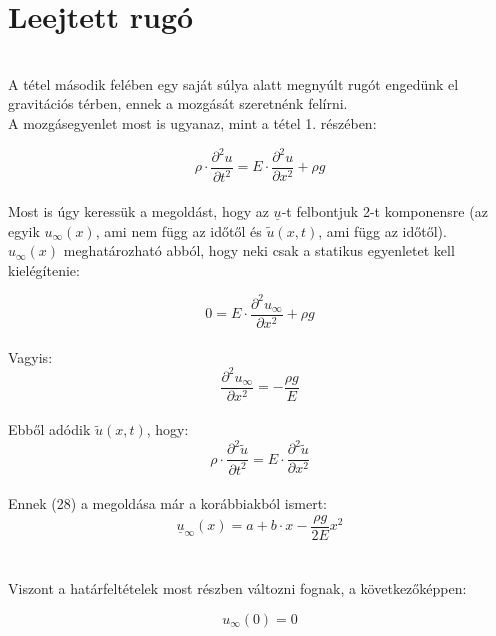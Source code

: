 \documentclass[a4paper]{article}
\begin{document}
\section*{Leejtett rugó}
\\
A tétel második felében egy saját súlya alatt megnyúlt rugót engedünk el gravitációs térben, ennek a mozgását szeretnénk felírni.
\\
A mozgásegyenlet most is ugyanaz, mint a tétel 1. részében:

\begin{equation}
\label{}
\rho \cdot\frac{\partial^{2} u}{\partial t^{2}}=E \cdot \frac{\partial^{2} u}{\partial x^{2}}+\rho g
\end{equation}
\\
Most is úgy keressük a megoldást, hogy az  $\underline{u}$-t felbontjuk 2-t komponensre (az egyik $u_{\infty}(x)$, ami nem függ az időtől és  $\tilde{u}(x,t)$, ami függ az időtől).
\\ 
$u_{\infty}(x)$ meghatározható abból, hogy neki csak a statikus egyenletet kell kielégítenie:

\begin{equation}
\label{}
0=E \cdot \frac{\partial^{2} u_{\infty}}{\partial x^{2}}+\rho g
\end{equation}
\\
Vagyis:
\begin{equation}
\label{}
\frac{\partial^{2} u_{\infty}}{\partial x^{2}}=- \frac{\rho g}{E}
\end{equation}
\\
Ebből adódik $\tilde{u}(x,t)$, hogy:
\begin{equation}
\label{}
\rho \cdot \frac{\partial^{2} \tilde{u}}{\partial t^{2}}=E \cdot \frac{\partial^{2} \tilde{u}}{\partial x^{2}}
\end{equation}
\\
Ennek (28) a megoldása már a korábbiakból ismert:
\begin{equation}
\label{}
\underline{u}_{\infty}(x)=a+b\cdot x-\frac{\rho g}{2E} x^{2}
\end{equation}
\\
\\Viszont a határfeltételek most részben változni fognak, a következőképpen:

\begin{equation}
\label{}
u_{\infty}(0)=0
\end{equation}
\end{document}
